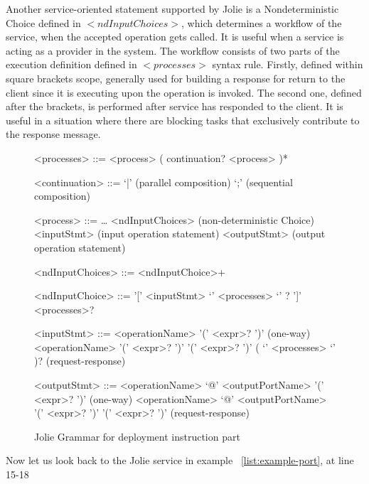 Another service-oriented statement supported by Jolie is a Nondeterministic Choice defined in \(<ndInputChoices>\), which determines a workflow of the service, when the accepted operation gets called. It is useful when a service is acting as a provider in the system. The workflow consists of two parts of the execution definition defined in \(<processes>\) syntax rule. Firstly, defined within square brackets scope, generally used for building a response for return to the client since it is executing upon the operation is invoked. The second one, defined after the brackets, is performed after service has responded to the client. It is useful in a situation where there are blocking tasks that exclusively contribute to the response message.

\begin{figure}[h]
    \begin{framed}
        \begin{grammar}
            <processes>
            ::= <process> ( continuation? <process> )*

            <continuation> ::= `|' \hfill (parallel composition)
            \alt `;' \hfill (sequential composition)

            <process> ::= \dots
            \alt <ndInputChoices> \hfill (non-deterministic Choice)
            \alt <inputStmt> \hfill (input operation statement)
            \alt <outputStmt> \hfill (output operation statement)

            <ndInputChoices>
            ::= <ndInputChoice>+

            <ndInputChoice>
            ::= '[' <inputStmt> `{' <processes> `}' ? ']' <processes>?

            <inputStmt>
            ::= <operationName> '(' <expr>? ')' \hfill (one-way)
            \alt
            <operationName> '(' <expr>? ')' '(' <expr>? ')' ( `{' <processes> `}' )? \hfill (request-response)

            <outputStmt>
            ::= <operationName> `@' <outputPortName> '(' <expr>? ')' \hfill (one-way)
            \alt
            <operationName> `@' <outputPortName> '(' <expr>? ')' '(' <expr>? ')' \hfill (request-response)
        \end{grammar}
    \end{framed}
    \caption{Jolie Grammar for deployment instruction part}
    \label{fig:jolie-process}
\end{figure}

Now let us look back to the Jolie service in example ~\ref{list:example-port}, at line 15-18

